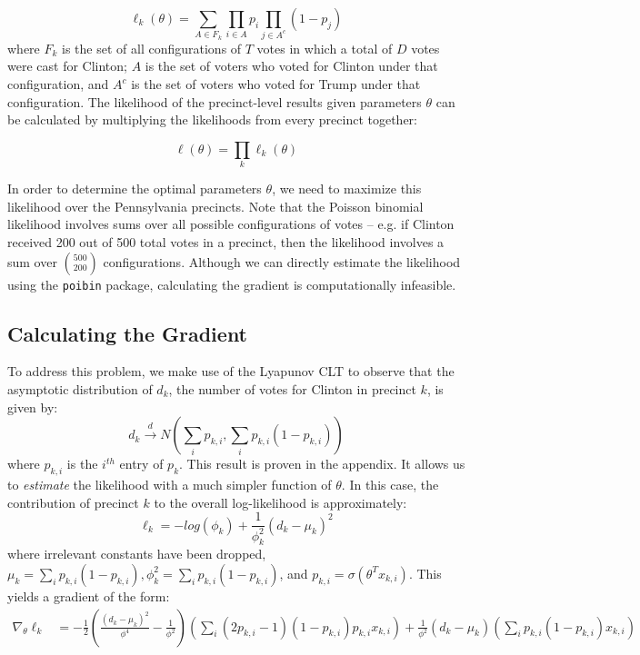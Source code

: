 \documentclass[10pt,twocolumn,letterpaper]{article}
\begin{document}
$$\ell_k(\theta) = \sum_{A \in F_k} \prod_{i \in A} p_i \prod_{j \in A^c}(1 - p_j)$$
where $F_k$ is the set of all configurations of $T$ votes in which a total of $D$ votes were cast for Clinton; $A$ is the set of voters who voted for Clinton under that configuration, and $A^c$ is the set of voters who voted for Trump under that configuration. The likelihood of the precinct-level results given parameters $\theta$ can be calculated by multiplying the likelihoods from every precinct together:

$$\ell(\theta) = \prod_k \ell_k(\theta)$$

In order to determine the optimal parameters $\theta$, we need to maximize this likelihood over the Pennsylvania precincts. Note that the Poisson binomial likelihood involves sums over all possible configurations of votes -- e.g. if Clinton received 200 out of 500 total votes in a precinct, then the likelihood involves a sum over $500 \choose 200$ configurations. Although we can directly estimate the likelihood using the \texttt{poibin} package, calculating the gradient is computationally infeasible.

\subsection{Calculating the Gradient}

To address this problem, we make use of the Lyapunov CLT \cite{LyapunovCondition} to observe that the asymptotic distribution of $d_k$, the number of votes for Clinton in precinct $k$, is given by: 
\[ d_k \stackrel{d} \longrightarrow N \left(\sum_{i} p_{k,i}, \sum_{i} p_{k, i}(1-p_{k, i}) \right) \] 
where $p_{k, i}$ is the $i^{th}$ entry of $p_k$. This result is proven in the appendix. It allows us to \emph{estimate} the likelihood with a much simpler function of $\theta$. In this case, the contribution of precinct $k$ to the overall log-likelihood is approximately: 
\[ \ell_k = -log \left( \phi_k\right) + \frac{1}{\phi_k^2} \left( d_k -\mu_k \right)^2  \] 
where irrelevant constants have been dropped, $\mu_k =  \sum_{i} p_{k, i}(1-p_{k, i}), \phi_k^2 = \sum_{i} p_{k, i}(1-p_{k, i})$, and $p_{k, i} = \sigma(\theta^T x_{k, i})$. This yields a gradient of the form: 
\begin{align*}
\nabla_{\theta} \ell_k &=  -\frac{1}{2} \left(\frac{(d_k - \mu_k)^2}{\phi^4} - \frac{1}{\phi^2} \right) \left( \sum_{i} (2 p_{k, i} - 1)(1-p_{k, i})p_{k, i}x_{k, i} \right) + \frac{1}{\phi^2} (d_k - \mu_k) \left( \sum_i p_{k, i} (1 - p_{k, i}) x_{k, i} \right)
\end{align*}
\end{document}
